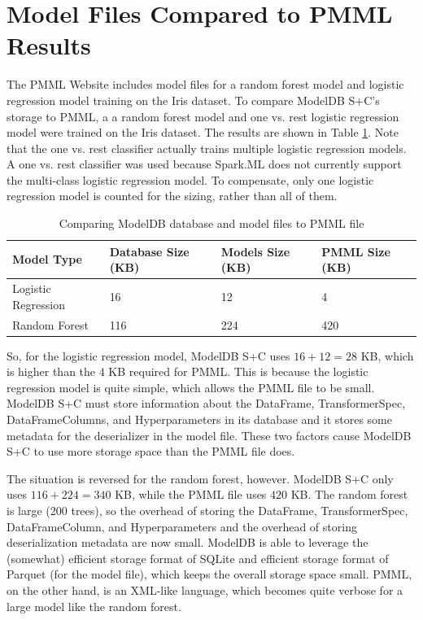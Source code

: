 \section{Model Files Compared to PMML Results}
The PMML Website includes model files for a random forest model and logistic regression
model training on the Iris dataset. To compare ModelDB S+C's storage to PMML, a
a random forest model and one vs. rest logistic regression model were trained on the Iris
dataset. The results are shown in Table \ref{tab:pmml}. Note that the one vs. rest classifier
actually trains multiple logistic regression models. A one vs. rest classifier was used
because Spark.ML does not currently support the multi-class logistic regression model. To
compensate, only one logistic regression model is counted for the sizing, rather than
all of them.

 \begin{table}
   \centering
    \begin{tabular}{ | l | l | l | l |}
      \hline
      Model Type & Database Size (KB) & Models Size (KB) & PMML Size (KB) \\ \hline
      Logistic Regression & 16 & 12 & 4 \\ \hline
      Random Forest & 116 & 224 & 420 \\ 
      \hline
   \end{tabular}
   \caption{Comparing ModelDB database and model files to PMML file}
   \label{tab:pmml}
 \end{table}

 So, for the logistic regression model, ModelDB S+C uses $16 + 12 = 28$ KB, which is
 higher than the $4$ KB required for PMML. This is because the logistic regression model
 is quite simple, which allows the PMML file to be small. ModelDB S+C must store information
 about the DataFrame, TransformerSpec, DataFrameColumns, and Hyperparameters in its database and
 it stores some metadata for the deserializer in the model file. These two factors cause ModelDB S+C
 to use more storage space than the PMML file does.

 The situation is reversed for the random forest, however. ModelDB S+C only uses $116 + 224 = 340$ KB,
 while the PMML file uses $420$ KB. The random forest is large (200 trees), so the overhead of storing the DataFrame,
 TransformerSpec, DataFrameColumn, and Hyperparameters and the overhead of storing deserialization metadata are now small.
 ModelDB is able to leverage the (somewhat) efficient storage format of SQLite and efficient storage format of Parquet (for 
 the model file), which keeps the overall storage space small. PMML, on the other hand, is an XML-like language, which becomes
 quite verbose for a large model like the random forest.

